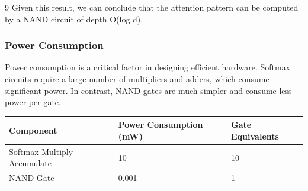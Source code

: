 \documentclass[11pt]{article}
\theoremstyle{definition}
\begin{document}
\begin{thebibliography}{9}
Given this result, we can conclude that the attention pattern can be computed by a NAND circuit of depth O(log d).













\subsubsection{Power Consumption}













Power consumption is a critical factor in designing efficient hardware. Softmax circuits require a large number of multipliers and adders, which consume significant power. In contrast, NAND gates are much simpler and consume less power per gate.













\begin{table}[h]






\centering






\begin{tabular}{|l|l|l|}






\hline






Component & Power Consumption (mW) & Gate Equivalents \\ \hline






Softmax Multiply-Accumulate & 10 & 10 \\ \hline






NAND Gate & 0.001 & 1 \\ \hline







\end{tabular}
\end{table}
\end{thebibliography}
\end{document}
